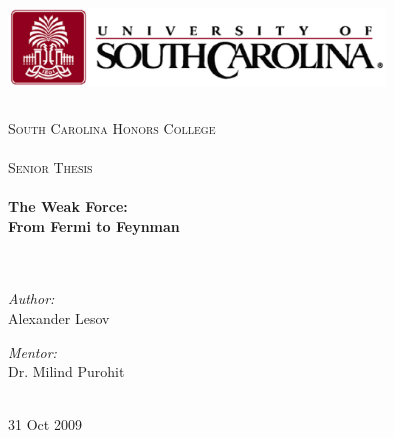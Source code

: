 \documentclass[12pt]{book}
\begin{document}
\begin{titlepage}
\begin{center}

\includegraphics[width=100mm, height=25mm]{figures/usclogo}\\
%
\ \\ %
\textsc{\Large
%
South Carolina Honors College\\
\ \\
Senior Thesis\\
\ \\}
%
%
{\huge \bfseries
The Weak Force: \\ From Fermi to Feynman
\\}
\ \\
\ \\
\begin{minipage}{0.4\textwidth}
\begin{flushleft} \large
\emph{Author:}\\
Alexander Lesov\\
\end{flushleft}
\end{minipage}
%
\begin{minipage}{0.4\textwidth}
\begin{flushright} \large
\emph{Mentor:} \\
Dr. Milind Purohit\\
\footnotesize{\ }
\end{flushright}
\end{minipage}
%
\vfill %
%
{\large 31 Oct 2009}
%
\end{center}

\end{titlepage}

\tableofcontents

\end{document}
